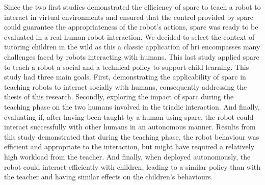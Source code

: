 Since the two first studies demonstrated the efficiency of \gls{sparc} to teach a robot to interact in virtual environments and ensured that the control provided by \gls{sparc} could guarantee the appropriateness of the robot's actions, \gls{sparc} was ready to be evaluated in a real human-robot interaction. We decided to select the context of tutoring children in the wild as this a classic application of \gls{hri} encompasses many challenges faced by robots interacting with humans. This last study applied \gls{sparc} to teach a robot a social and a technical policy to support child learning. This study had three main goals. First, demonstrating the applicability of \gls{sparc} in teaching robots to interact socially with humans, consequently addressing the thesis of this research. Secondly, exploring the impact of \gls{sparc} during the teaching phase on the two humans involved in the triadic interaction. And finally, evaluating if, after having been taught by a human using \gls{sparc}, the robot could interact successfully with other humans in an autonomous manner. Results from this study demonstrated that during the teaching phase, the robot behaviour was efficient and appropriate to the interaction, but might have required a relatively high workload from the teacher. And finally, when deployed autonomously, the robot could interact efficiently with children, leading to a similar policy than with the teacher and having similar effects on the children's behaviours.

